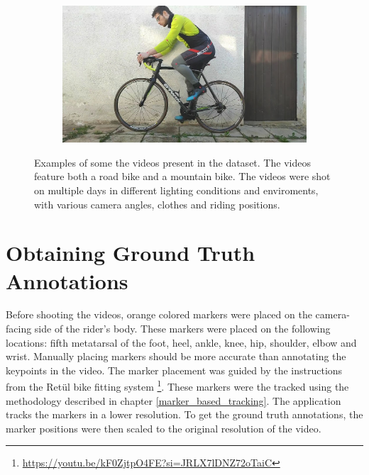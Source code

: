 \begin{figure}[htbp]
\begin{subfigure}[b]{\imgwidth}
    \end{subfigure}
    \hfill
    \begin{subfigure}[b]{\imgwidth}
        \centering

        \includegraphics[width=1\linewidth]{obrazky-figures/9.jpg}
    \end{subfigure}


    \caption{Examples of some the videos present in the dataset. The videos feature both a road bike and a mountain bike. The videos were shot on multiple days in different lighting conditions and enviroments, with various camera angles, clothes and riding positions.}
    \label{fig:examples}
\end{figure}




\section{Obtaining Ground Truth Annotations}
Before shooting the videos, orange colored markers were placed on the camera-facing side of the rider's body. These markers were placed on the following locations: fifth metatarsal of the foot, heel, ankle, knee, hip, shoulder, elbow and wrist. Manually placing markers should be more accurate than annotating the keypoints in the video. The marker placement was guided by the instructions from the Retül bike fitting system \footnote{\url{https://youtu.be/kF0ZjtpO4FE?si=JRLX7lDNZ72oTaiC}}. These markers were the tracked using the methodology described in chapter \ref{marker_based_tracking}. The application tracks the markers in a lower resolution. To get the ground truth annotations, the marker positions were then scaled to the original resolution of the video.


